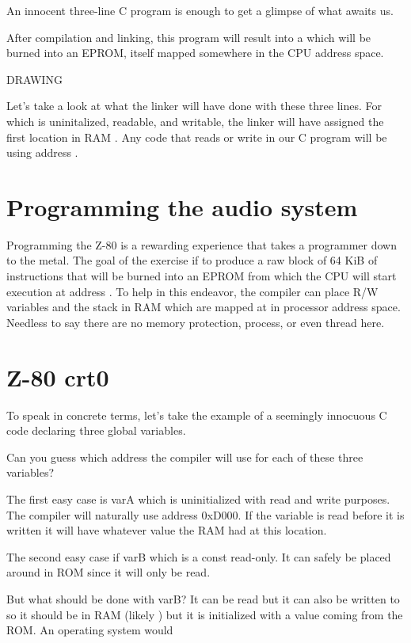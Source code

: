 An innocent three-line C program is enough to get a glimpse of what awaits us.



After compilation and linking, this program will result into a  which will be burned into an EPROM, itself mapped somewhere in the CPU address space.

DRAWING

Let's take a look at what the linker will have done with these three lines.
 For  which is uninitalized, readable, and writable, the linker will have assigned the first location in RAM . Any code that reads or write  in our C program will be using address .

\section{Programming the audio system}
Programming the Z-80 is a rewarding experience that takes a programmer down to the metal. The goal of the exercise if to produce a raw block of 64 KiB of instructions that will be burned into an EPROM from which the CPU will start execution at address . To help in this endeavor, the compiler can place R/W variables and the stack in RAM which are mapped at  in processor address space. Needless to say there are no memory protection, process, or even thread here.


\section{Z-80 crt0}
To speak in concrete terms, let's take the example of a seemingly innocuous C code declaring three global variables.



Can you guess which address the compiler will use for each of these three variables?

The first easy case is varA which is uninitialized with read and write purposes. The compiler will naturally use address 0xD000. If the variable is read before it is written it will have whatever value the RAM had at this location. 

The second easy case if varB which is a const read-only. It can safely be placed around  in ROM since it will only be read.

But what should be done with varB? It can be read but it can also be written to so it should be in RAM (likely ) but it is initialized with a value coming from the ROM. An operating system would 

